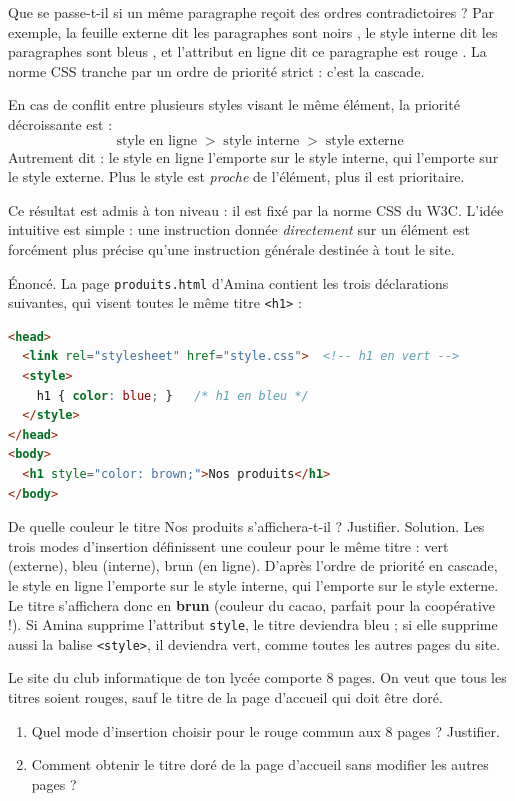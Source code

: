 \documentclass[11pt]{article}
\newcommand{\cle}[1]{{\popxbold\color{popdark}#1}}
\begin{document}
Que se passe-t-il si un même paragraphe reçoit des ordres contradictoires ? Par exemple, la feuille externe dit \og les paragraphes sont noirs \fg{}, le style interne dit \og les paragraphes sont bleus \fg{}, et l'attribut en ligne dit \og ce paragraphe est rouge \fg{}. La norme CSS tranche par un ordre de priorité strict : c'est la \cle{cascade}.

\begin{propriete}
En cas de conflit entre plusieurs styles visant le même élément, la priorité décroissante est :
\[ \text{style en ligne} \;>\; \text{style interne} \;>\; \text{style externe} \]
Autrement dit : le style en ligne l'emporte sur le style interne, qui l'emporte sur le style externe. Plus le style est \emph{proche} de l'élément, plus il est prioritaire.
\end{propriete}

Ce résultat est admis à ton niveau : il est fixé par la norme CSS du W3C. L'idée intuitive est simple : une instruction donnée \emph{directement} sur un élément est forcément plus précise qu'une instruction générale destinée à tout le site.

\begin{exoresolu}
Énoncé. La page \texttt{produits.html} d'Amina contient les trois déclarations suivantes, qui visent toutes le même titre \texttt{<h1>} :
\begin{lstlisting}[language=HTML]
<head>
  <link rel="stylesheet" href="style.css">  <!-- h1 en vert -->
  <style>
    h1 { color: blue; }   /* h1 en bleu */
  </style>
</head>
<body>
  <h1 style="color: brown;">Nos produits</h1>
</body>
\end{lstlisting}
De quelle couleur le titre \og Nos produits \fg{} s'affichera-t-il ? Justifier.
\tcblower
Solution. Les trois modes d'insertion définissent une couleur pour le même titre : vert (externe), bleu (interne), brun (en ligne). D'après l'ordre de priorité en cascade, le style en ligne l'emporte sur le style interne, qui l'emporte sur le style externe. Le titre s'affichera donc en \textbf{brun} (couleur du cacao, parfait pour la coopérative !). Si Amina supprime l'attribut \texttt{style}, le titre deviendra bleu ; si elle supprime aussi la balise \texttt{<style>}, il deviendra vert, comme toutes les autres pages du site.
\end{exoresolu}

\begin{exercice}
Le site du club informatique de ton lycée comporte 8 pages. On veut que tous les titres soient rouges, sauf le titre de la page d'accueil qui doit être doré.
\begin{enumerate}
  \item Quel mode d'insertion choisir pour le rouge commun aux 8 pages ? Justifier.
  \item Comment obtenir le titre doré de la page d'accueil sans modifier les autres pages ?
\end{enumerate}
\end{exercice}
\end{document}
